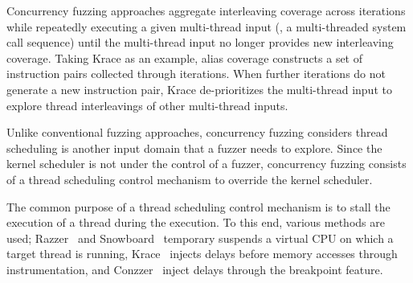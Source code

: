 Concurrency fuzzing approaches aggregate interleaving coverage across
iterations while repeatedly executing a given multi-thread input (\ie,
a multi-threaded system call sequence) until the multi-thread input no
longer provides new interleaving coverage.
%
Taking Krace as an example, alias coverage constructs a set of
instruction pairs collected through iterations. When further
iterations do not generate a new instruction pair, Krace
de-prioritizes the multi-thread input to explore thread interleavings
of other multi-thread inputs.











%
Unlike conventional fuzzing approaches, concurrency fuzzing considers
thread scheduling is another input domain that a fuzzer needs to
explore.
%
Since the kernel scheduler is not under the control of a fuzzer,
concurrency fuzzing consists of a thread scheduling control mechanism
to override the kernel scheduler.


The common purpose of a thread scheduling control mechanism is to
stall the execution of a thread during the execution.
%
To this end, various methods are used; Razzer~\cite{razzer} and
Snowboard~\cite{snowboard} temporary suspends a virtual CPU on which a
target thread is running, Krace~\cite{krace} injects delays before
memory accesses through instrumentation, and Conzzer~\cite{conzzer}
inject delays through the breakpoint feature.


